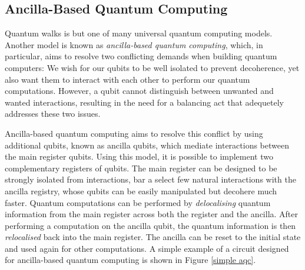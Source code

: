 \subsection{Ancilla-Based Quantum Computing}
Quantum walks is but one of many universal quantum computing models.
Another model is known as \emph{ancilla-based quantum computing}, which, in particular, aims to resolve two conflicting demands when building quantum computers:
We wish for our qubits to be well isolated to prevent decoherence, yet also want them to interact with each other to perform our quantum computations.
However, a qubit cannot distinguish between unwanted and wanted interactions, resulting in the need for a balancing act that adequetely addresses these two issues.

Ancilla-based quantum computing aims to resolve this conflict by using additional qubits, known as ancilla qubits, which mediate interactions between the main register qubits. 
Using this model, it is possible to implement two complementary registers of qubits.
The main register can be designed to be strongly isolated from interactions, bar a select few natural interactions with the ancilla registry, whose qubits can be easily manipulated but decohere much faster. Quantum computations can be performed by \emph{delocalising} quantum information from the main register across both the register and the ancilla. After performing a computation on the ancilla qubit, the quantum information is then \emph{relocalised} back into the main register.
The ancilla can be reset to the initial state and used again for other computations.
A simple example of a circuit designed for ancilla-based quantum computing is shown in Figure \ref{simple aqc}. 

